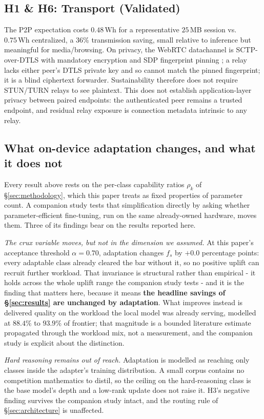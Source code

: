 \documentclass[conference]{IEEEtran}
\newcommand{\Wh}{\,\text{Wh}}
\newcommand{\fs}{f_{s}}
\begin{document}
\subsection{H1 \& H6: Transport (Validated)}
The P2P expectation costs $0.48\Wh$ for a representative $25$\,MB session vs.\
$0.75\Wh$ centralized, a $36\%$ transmission saving, small relative to inference
but meaningful for media/browsing. On privacy, the WebRTC datachannel is
SCTP-over-DTLS with mandatory encryption and SDP fingerprint pinning
\cite{rfc8831,rfc8827}; a relay lacks either peer's DTLS private key and so
cannot match the pinned fingerprint; it is a blind ciphertext forwarder.
Sustainability therefore does not require STUN/TURN relays to see plaintext.
This does not establish application-layer privacy between paired endpoints:
the authenticated peer remains a trusted endpoint, and residual relay exposure is
connection metadata intrinsic to any relay.

\subsection{What on-device adaptation changes, and what it does not}
\label{sec:pass3}
Every result above rests on the per-class capability ratios $\rho_k$ of
\S\ref{sec:methodology}, which this paper treats as fixed properties of
parameter count. A companion study \cite{autoyou2026adaptation} tests that
simplification directly by asking whether parameter-efficient fine-tuning, run
on the same already-owned hardware, moves them. Three of its findings bear on
the results reported here.

\emph{The crux variable moves, but not in the dimension we assumed.} At this
paper's acceptance threshold $\alpha=0.70$, adaptation changes $\fs$ by
$+0.0$ percentage points: every adaptable class already cleared the bar without
it, so no positive uplift can recruit further workload. That invariance is
structural rather than empirical - it holds across the whole uplift range the
companion study tests - and it is the finding that matters here, because it
means \textbf{the headline savings of \S\ref{sec:results} are unchanged by
adaptation}. What improves instead is delivered quality on the workload the
local model was already serving, modelled at $88.4\%$ to $93.9\%$ of frontier;
that magnitude is a bounded literature estimate propagated through the workload
mix, not a measurement, and the companion study is explicit about the
distinction.

\emph{Hard reasoning remains out of reach.} Adaptation is modelled as reaching
only classes inside the adapter's training distribution. A small corpus contains
no competition mathematics to distil, so the ceiling on
the hard-reasoning class is the base model's depth and a low-rank update does not
raise it. H3's negative finding survives the companion study intact, and the
routing rule of \S\ref{sec:architecture} is unaffected.
\end{document}
